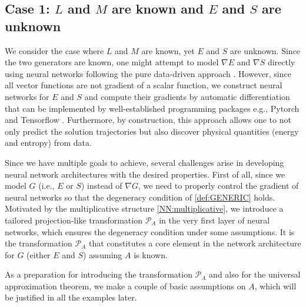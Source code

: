 \documentclass[openacc]{rsproca_new}%
\begin{document}
\subsection{Case 1: \texorpdfstring{$L$}{L} and \texorpdfstring{$M$}{M} are known and \texorpdfstring{$E$}{E} and \texorpdfstring{$S$}{S} are unknown}
We consider the case where $L$ and $M$ are known, yet $E$ and $S$ are unknown.
Since the two generators are known, 
one might attempt to model $\nabla E$ and $\nabla S$
directly using neural networks following the pure data-driven approach \cite{ChenRBD18}.
However, 
since all vector functions are not gradient of a scalar function, 
we construct neural networks for $E$ and $S$
and compute their gradients by automatic differentiation that can be implemented by well-established programming packages e.g., Pytorch \cite{paszke2019pytorch} and Tensorflow \cite{abadi2016tensorflow}.
Furthermore, by construction, 
this approach 
allows one to not only predict the solution trajectories but also discover
physical quantities (energy and entropy)
from data.



Since we have multiple goals to achieve,
several challenges arise in developing 
neural network architectures with the desired properties. 
First of all, since we model $G$ (i.e., $E$ or $S$) instead of $\nabla G$,
we need to properly control the gradient of neural networks
so that the degeneracy condition of \eqref{def:GENERIC} holds. 
Motivated by the multiplicative structure \eqref{NN:multiplicative},
we introduce a tailored projection-like transformation $\mathcal{P}_A$ in
the very first layer of neural networks, 
which ensures the degeneracy condition
under some assumptions.
It is the transformation $\mathcal{P}_A$ 
that constitutes 
a core element in the network architecture
for $G$ (either $E$ and $S$)
assuming $A$ is known.


As a preparation for introducing the transformation $\mathcal{P}_A$ 
and also for the universal approximation theorem,
we make a couple of basic assumptions on $A$,
which will be justified in all the examples later.
\end{document}
